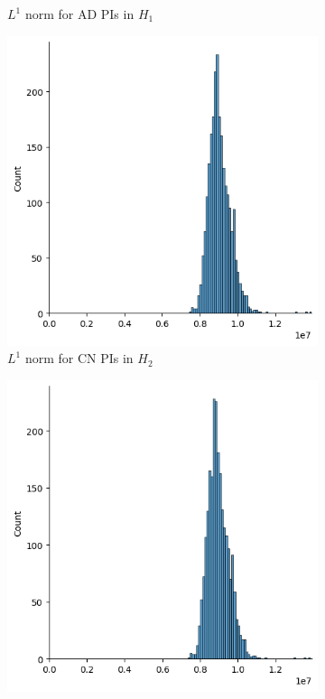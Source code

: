 \documentclass{article}
\begin{document}
\begin{figure}
\begin{subfigure}{0.32\textwidth}
    \caption{$L^1$ norm for AD PIs in $H_1$}
  \end{subfigure}
  \begin{subfigure}{0.32\textwidth}
    \includegraphics[width=\textwidth]{figures/PIs/displot_median_pi_CN_H_2.png}
    \caption{$L^1$ norm for CN PIs in $H_2$}
  \end{subfigure}
  \begin{subfigure}{0.32\textwidth}
    \includegraphics[width=\textwidth]{figures/PIs/displot_median_pi_MCI_H_2.png}

\end{subfigure}
\end{figure}
\end{document}
